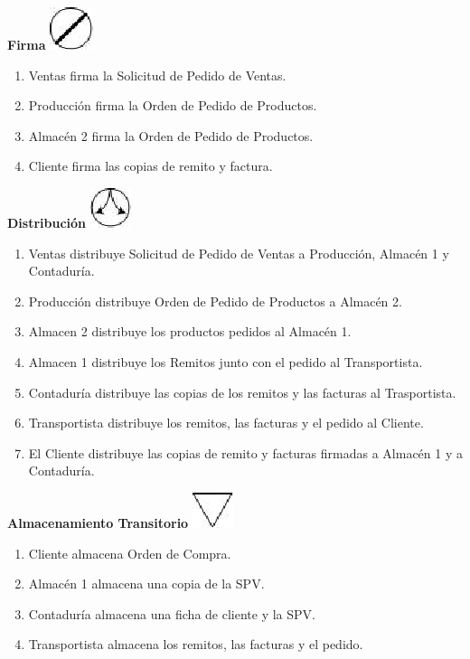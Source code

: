 \begin{center}
  \textbf{Firma}
  \includegraphics{./Images/Simbolos/simbolo-Firma.png}
\end{center}
\begin{enumerate}
  \item Ventas firma la Solicitud de Pedido de Ventas.
  \item Producci\'on firma la Orden de Pedido de Productos.
  \item Almac\'en 2 firma la Orden de Pedido de Productos.
  \item Cliente firma las copias de remito y factura.
\end{enumerate}

\begin{center}
  \textbf{Distribuci\'on}
  \includegraphics{./Images/Simbolos/simbolo-Distribucion.png}
\end{center}
\begin{enumerate}
  \item Ventas distribuye Solicitud de Pedido de Ventas a Producci\'on, Almac\'en 1 y Contadur\'ia.
  \item Producci\'on distribuye Orden de Pedido de Productos a Almac\'en 2.
  \item Almacen 2 distribuye los productos pedidos al Almac\'en 1.
  \item Almacen 1 distribuye los Remitos junto con el pedido al Transportista.
  \item Contadur\'ia distribuye las copias de los remitos y las facturas al Trasportista.
  \item Transportista distribuye los remitos, las facturas y el pedido al Cliente.
  \item El Cliente distribuye las copias de remito y facturas firmadas a Almac\'en 1 y a Contadur\'ia.
\end{enumerate}

\begin{center}
  \textbf{Almacenamiento Transitorio}
  \includegraphics{./Images/Simbolos/simbolo-Almacenamiento-Transitorio.png}
\end{center}
\begin{enumerate}
  \item Cliente almacena Orden de Compra.
  \item Almac\'en 1 almacena una copia de la SPV.
  \item Contadur\'ia almacena una ficha de cliente y la SPV.
  \item Transportista almacena los remitos, las facturas y el pedido.
\end{enumerate}

